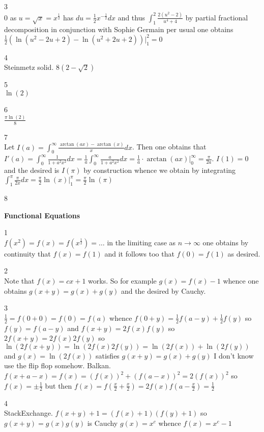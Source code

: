 3 \\
$\boxed{0}$ as $u=\sqrt{x}=x^{\frac{1}{2}}$ has $du=\frac{1}{2}x^{-\frac{1}{2}}dx$ and thus $\int_1^2 \frac{2(u^2-2)}{u^4+4}$ by partial fractional decomposition in conjunction with Sophie Germain per usual one obtains $\frac{1}{2}(\ln(u^2-2u+2)-\ln(u^2+2u+2)) |_1^2 = 0$

4 \\
Steinmetz solid. $\boxed{8(2-\sqrt{2})}$

5 \\
$\boxed{\ln(2)}$

6 \\
$\boxed{\frac{\pi \ln(2)}{8}}$

7 \\
Let $I(a)=\int_0^{\infty} \frac{\arctan(ax)-\arctan(x)}{x} dx$. Then one obtains that $I'(a)=\int_0^{\infty} \frac{1}{1+a^2 x^2} dx = \frac{1}{a} \int_0^{\infty} \frac{a}{1+a^2 x^2} dx = \frac{1}{a} \cdot \arctan(ax) |_0^{\infty} = \frac{\pi}{2a}$. $I(1)=0$ and the desired is $I(\pi)$ by construction whence we obtain by integrating $\int_1^{\pi} \frac{\pi}{2x} dx = \frac{\pi}{2} \ln(x)|_1^{\pi} = \boxed{\frac{\pi}{2} \ln(\pi)}$

8 \\


\newpage

\textbf{Functional Equations}

1 \\
$f(x^2)=f(x)=f(x^{\frac{1}{2}})=\dots$ in the limiting case as $n \to \infty$ one obtains by continuity that $f(x)=f(1)$ and it follows too that $f(0)=f(1)$ as desired.

2 \\
Note that $\boxed{f(x)=cx+1}$ works. So for example $g(x)=f(x)-1$ whence one obtains $g(x+y)=g(x)+g(y)$ and the desired by Cauchy.

3 \\
$\frac{1}{2}=f(0+0)=f(0)=f(a)$ whence $f(0+y)=\frac{1}{2}f(a-y)+\frac{1}{2}f(y)$ so $f(y)=f(a-y)$ and $f(x+y)=2f(x)f(y)$ so $2f(x+y)=2f(x)2f(y)$ so $\ln(2f(x+y))=\ln(2f(x)2f(y))=\ln(2f(x))+\ln(2f(y))$ and $g(x)=\ln(2f(x))$ satisfies $g(x+y)=g(x)+g(y)$ I don't know use the flip flop somehow. Balkan. $f(x+a-x)=f(x)=(f(x))^2+(f(a-x))^2=2(f(x))^2$ so $f(x)=\pm \frac{1}{2}$ but then $f(x)=f\left(\frac{x}{2}+\frac{x}{2} \right)=2f(x)f\left(a-\frac{x}{2}\right)=\frac{1}{2}$

4 \\
StackExchange. $f(x+y)+1=(f(x)+1)(f(y)+1)$ so $g(x+y)=g(x)g(y)$ is Cauchy $g(x)=x^c$ whence $\boxed{f(x)=x^c-1}$

